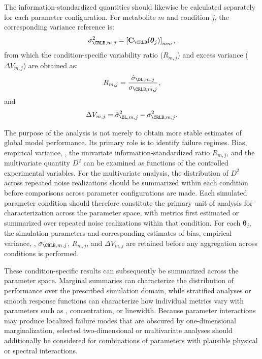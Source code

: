 The information-standardized quantities should likewise be calculated separately for each parameter configuration. For metabolite $m$ and condition $j$, the corresponding \CRLB variance reference is:
\begin{equation}
    \sigma_{\CRLB,m,j}^{2} = \left[\mathbf{C}_{\CRLB}(\boldsymbol{\theta}_j)\right]_{mm},
\end{equation}
from which the condition-specific variability ratio ($R_{m,j}$) and excess variance ($\Delta V_{m,j}$) are obtained as:
\begin{equation}
    R_{m,j} = \frac{\hat{\sigma}_{\DL,m,j}}{\sigma_{\CRLB,m,j}},
\end{equation}
and
\begin{equation}
    \Delta V_{m,j} = \hat{\sigma}_{\DL,m,j}^{2} - \sigma_{\CRLB,m,j}^{2}.
\end{equation}

The purpose of the \MC analysis is not merely to obtain more stable estimates of global model performance. Its primary role is to identify failure regimes. Bias, empirical variance, \RMSE, the univariate information-standardized ratio $R_{m,j}$, and the multivariate quantity $D^{2}$ can be examined as functions of the controlled experimental variables. For the multivariate analysis, the distribution of $D^{2}$ across repeated noise realizations should be summarized within each condition before comparisons across parameter configurations are made. Each simulated parameter condition should therefore constitute the primary unit of analysis for characterization across the parameter space, with metrics first estimated or summarized over repeated noise realizations within that condition. 
For each $\boldsymbol{\theta}_j$, the simulation parameters and corresponding estimates of bias, empirical variance, \RMSE, $\sigma_{\CRLB,m,j}$, $R_{m,j}$, and $\Delta V_{m,j}$ are retained before any aggregation across conditions is performed.

These condition-specific results can subsequently be summarized across the parameter space. Marginal summaries can characterize the distribution of performance over the prescribed simulation domain, while stratified analyses or smooth response functions can characterize how individual metrics vary with parameters such as \SNR, concentration, or linewidth. Because parameter interactions may produce localized failure modes that are obscured by one-dimensional marginalization, selected two-dimensional or multivariate analyses should additionally be considered for combinations of parameters with plausible physical or spectral interactions.

